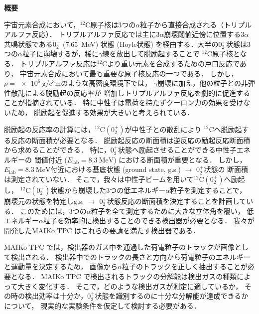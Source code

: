 \documentclass[./master]{subfiles}
\begin{document}
\mbox{}

\begin{center}\LARGE\textbf{概要}\end{center}
\vspace{\baselineskip}

  宇宙元素合成において，${}^{12}\mathrm{C}$原子核は3つの$\alpha$粒子から直接合成される（トリプルアルファ反応）．
  トリプルアルファ反応では主に3$\alpha$崩壊閾値近傍に位置する3$\alpha$共鳴状態である$0_2^+$ (\SI{7.65}{\mega\electronvolt})
  状態 (Hoyle状態) を経由する．大半の$0_2^+$状態は3つの$\alpha$粒子に崩壊するが，稀に$\gamma$線を放出して脱励起することで
  ${}^{12}\mathrm{C}$原子核となる．
  トリプルアルファ反応は${}^{12}\mathrm{C}$より重い元素を合成するための戸口反応であり，
  宇宙元素合成において最も重要な原子核反応の一つである．
  しかし，$\rho = \SI{e6}{\gram\per\cubic\centi\metre}$のような高密度環境下では，
  $\gamma$崩壊に加え，他の粒子との非弾性散乱による脱励起の反応率が
  増加しトリプルアルファ反応を劇的に促進することが指摘されている．
  特に中性子は電荷を持たずクーロン力の効果を受けないため，
  脱励起を促進する効果が大きいと考えられている．

  脱励起の反応率の計算には，${}^{12}\mathrm{C} (0_2^+)$が中性子との散乱により
  ${}^{12}\mathrm{C}$へ脱励起する反応の断面積が必要となる．
  脱励起反応の断面積は逆反応の励起反応断面積から求めることができる．
  特に，$0_2^+$状態へ励起させることができる中性子エネルギーの
  閾値付近 ($E_{\text{lab}} = \SI{8.3}{\mega\electronvolt}$) における断面積が重要となる．
  しかし，$E_{\text{lab}} = \SI{8.3}{\mega\electronvolt}$付近における基底状態 (ground state, g.s.) $\rightarrow$ $0_2^+$状態の
  断面積は測定されていない．
  そこで，我々は中性子ビームを用いて${}^{12}\mathrm{C} (0_2^+)$へ励起し，
  ${}^{12}\mathrm{C} (0_2^+)$状態から崩壊した3つの低エネルギー$\alpha$粒子を測定することで，
  崩壊元の状態を特定しg.s. $\rightarrow$ $0_2^+$状態反応の断面積を決定することを計画している．
  このためには，3つの$\alpha$粒子を全て測定するために大きな立体角を覆い，
  低エネルギー$\alpha$粒子を効率的に検出することのできる検出器が必要となる．
  我々が開発したMAIKo TPC はこれらの要請を満たす検出器である．

  MAIKo TPC では，検出器のガス中を通過した荷電粒子のトラックが画像として検出される．
  検出器中でのトラックの長さと方向から荷電粒子のエネルギーと運動量を決定するため，
  画像から$\alpha$粒子のトラックを正しく抽出することが必要となる．
  MAIKo TPC で検出されるトラックの分解能は検出ガスの種類によって大きく変化する．
  そこで，どのような検出ガスが測定に適しているか，
  その時の検出効率は十分か，$0_2^+$状態を識別するのに十分な分解能が達成できるかについて，
  現実的な実験条件を仮定して検討する必要がある．
\end{document}
